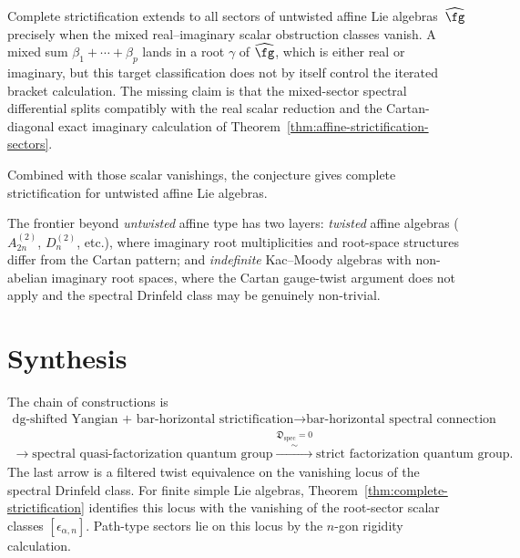 \begin{conjecture}%
\label{conj:affine-strictification-mixed}%
%
Complete strictification extends to all sectors of untwisted affine Lie
algebras~$\widehat\fg$ precisely when the mixed real--imaginary scalar
obstruction classes vanish. A mixed sum
$\beta_1+\cdots+\beta_p$ lands in a root $\gamma$ of $\widehat\fg$,
which is either real or imaginary, but this target classification does
not by itself control the iterated bracket calculation. The missing
claim is that the mixed-sector spectral differential splits compatibly
with the real scalar reduction and the Cartan-diagonal exact imaginary
calculation of Theorem~\textup{\ref{thm:affine-strictification-sectors}}.

Combined with those scalar vanishings, the conjecture gives complete
strictification for untwisted affine Lie algebras.

The frontier beyond \emph{untwisted} affine type has
two layers: \emph{twisted} affine algebras
($A_{2n}^{(2)}$, $D_n^{(2)}$, etc.), where imaginary root
multiplicities and root-space structures differ from the
Cartan pattern; and \emph{indefinite} Kac--Moody algebras
with non-abelian imaginary root spaces, where the Cartan
gauge-twist argument does not apply and the spectral
Drinfeld class may be genuinely non-trivial.
\end{conjecture}

\section{Synthesis}

The chain of constructions is
\begin{gather*}
\text{dg-shifted Yangian + bar-horizontal strictification}
\longrightarrow
\text{bar-horizontal spectral connection}\\
\longrightarrow
\text{spectral quasi-factorization quantum group}
\overset{\mathfrak D_{\mathrm{spec}}=0}{\xrightarrow{\;\sim\;}}
\text{strict factorization quantum group}.
\end{gather*}
The last arrow is a filtered twist equivalence on the vanishing locus
of the spectral Drinfeld class. For finite simple Lie algebras,
Theorem~\ref{thm:complete-strictification} identifies this locus with
the vanishing of the root-sector scalar classes
$[\epsilon_{\alpha,n}]$. Path-type sectors lie on this locus by the
$n$-gon rigidity calculation.

